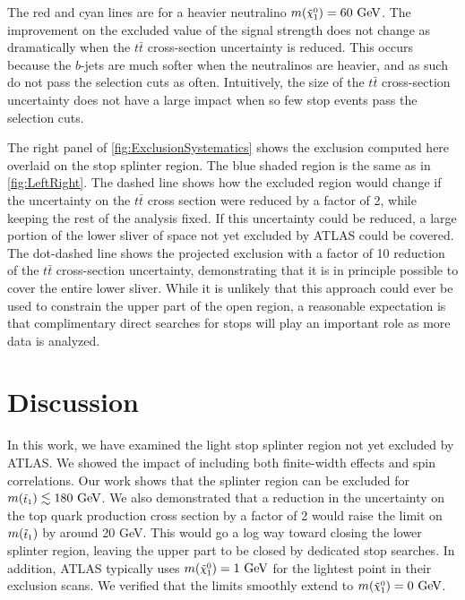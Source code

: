 \documentclass[a4paper,12pt]{article}
\newcommand{\gev}{~\text{GeV}}
\def\mnino{\ensuremath{m({\footnotesize \ninoone})}}
\def\mstop{\ensuremath{m({\footnotesize \stopone})}}
\def\stopone{\ensuremath{\mathchoice%
      {\displaystyle\raise.0ex\hbox{$\displaystyle\tilde t_1$}}%
         {\textstyle\raise-.2ex\hbox{$\textstyle\tilde t_1$}}%
       {\scriptstyle\raise.0ex\hbox{$\scriptstyle\tilde t_1$}}%
 {\scriptscriptstyle\raise.0ex\hbox{$\scriptscriptstyle\tilde t_1$}}}}
\def\ninoone{\ensuremath{\mathchoice%
      {\displaystyle\raise.4ex\hbox{$\displaystyle\tilde\chi^0_1$}}%
         {\textstyle\raise.1ex\hbox{$\textstyle\tilde\chi^0_1$}}%
       {\scriptstyle\raise.3ex\hbox{$\scriptstyle\tilde\chi^0_1$}}%
 {\scriptscriptstyle\raise.3ex\hbox{$\scriptscriptstyle\tilde\chi^0_1$}}}}
\begin{document}
The red and cyan lines are for a heavier neutralino $\mnino=60\gev$. The improvement on the excluded value of the signal strength does not change as dramatically when the $t\bar{t}$ cross-section uncertainty is reduced. This occurs because the $b$-jets are much softer  when the neutralinos are heavier, and as such do not pass the selection cuts as often.  Intuitively, the size of the $t\bar{t}$ cross-section uncertainty does not have a large impact when so few stop events pass the selection cuts.

The right panel of \cref{fig:ExclusionSystematics} shows the exclusion computed here overlaid on the stop splinter region. The blue shaded region is the same as in \cref{fig:LeftRight}. The dashed line shows how the excluded region would change if the uncertainty on the $t\bar{t}$ cross section were reduced by a factor of 2, while keeping the rest of the analysis fixed.  If this uncertainty could be reduced, a large portion of the lower sliver of space not yet excluded by ATLAS could be covered. The dot-dashed line shows the projected exclusion with a factor of 10 reduction of the $t\bar{t}$ cross-section uncertainty, demonstrating that it is in principle possible to cover the entire lower sliver.  While it is unlikely that this approach could ever be used to constrain the upper part of the open region, a reasonable expectation is that complimentary direct searches for stops will play an important role as more data is analyzed.

\section{Discussion}
\label{sec:discussion}

In this work, we have examined the light stop splinter region not yet excluded by ATLAS.  We showed the impact of including both finite-width effects and spin correlations.  Our work shows that the splinter region can be excluded for $\mstop \lesssim 180 \gev$.  We also demonstrated that a reduction in  the uncertainty on the top quark production cross section by a factor of 2 would raise the limit on $\mstop$ by around 20 GeV. This would go a log way toward closing the lower splinter region, leaving the upper part to be closed by dedicated stop searches. In addition, ATLAS typically uses $\mnino=1\gev$ for the lightest point in their exclusion scans. We verified that the limits smoothly extend to $\mnino=0\gev$.
\end{document}
